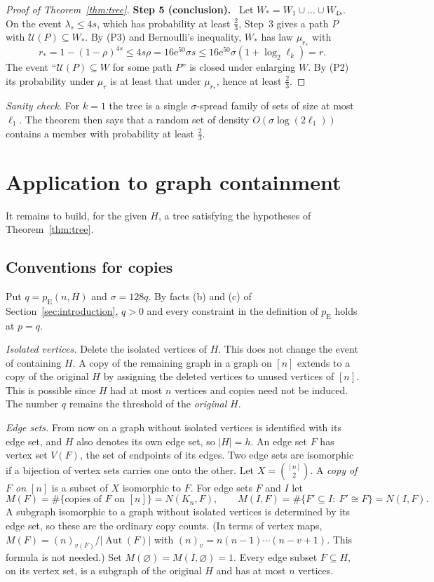 \documentclass[11pt]{article}
\numberwithin{equation}{section}
\newcommand{\pE}{p_{\mathrm E}}
\newcommand{\UU}{\mathcal U}
\newcommand{\ee}{\mathrm e}
\newcommand{\step}[2]{\medskip\noindent\textbf{Step #1 (#2).}\ }
\begin{document}
\begin{proof}[Proof of Theorem~\ref{thm:tree}]
\step{5}{conclusion}
Let $W_*=W_1\cup\dots\cup W_{4s}$. On the event $\lambda_s\le4s$,
which has probability at least $\frac23$, Step~3 gives a path $P$ with
$\UU(P)\subseteq W_*$. By (P3) and Bernoulli's inequality, $W_*$ has
law $\mu_{r_*}$ with
\[
 r_*=1-(1-\rho)^{4s}
 \le4s\rho
 =16\ee^{50}\sigma s
 \le16\ee^{50}\sigma(1+\log_2\ell_k)=r .
\]
The event ``$\UU(P)\subseteq W$ for some path $P$'' is closed under
enlarging $W$. By (P2) its probability under $\mu_r$ is at least that
under $\mu_{r_*}$, hence at least $\frac23$.
\end{proof}

\emph{Sanity check.} For $k=1$ the tree is a single $\sigma$-spread
family of sets of size at most $\ell_1$. The theorem then says that a
random set of density $O(\sigma\log(2\ell_1))$ contains a member with
probability at least $\frac23$.

\section{Application to graph containment}\label{sec:graphs}

It remains to build, for the given $H$, a tree satisfying the
hypotheses of Theorem~\ref{thm:tree}.

\subsection{Conventions for copies}

Put $q=\pE(n,H)$ and $\sigma=128q$. By facts (b) and (c) of
Section~\ref{sec:introduction}, $q>0$ and every constraint in the
definition of $\pE$ holds at $p=q$.

\emph{Isolated vertices.} Delete the isolated vertices of $H$. This
does not change the event of containing $H$. A copy of the remaining
graph in a graph on $[n]$ extends to a copy of the original $H$ by
assigning the deleted vertices to unused vertices of $[n]$. This is
possible since $H$ had at most $n$ vertices and copies need not be
induced. The number $q$ remains the threshold of the \emph{original}
$H$.

\emph{Edge sets.} From now on a graph without isolated vertices is
identified with its edge set, and $H$ also denotes its own edge set, so
$|H|=h$. An edge set $F$ has vertex set $V(F)$, the set of endpoints of
its edges. Two edge sets are isomorphic if a bijection of vertex sets
carries one onto the other. Let $X=\binom{[n]}2$. A \emph{copy of $F$
on $[n]$} is a subset of $X$ isomorphic to $F$. For edge sets $F$ and
$I$ let
\[
 M(F)=\#\{\text{copies of $F$ on $[n]$}\}=N(K_n,F),\qquad
 M(I,F)=\#\{F'\subseteq I:\ F'\cong F\}=N(I,F).
\]
A subgraph isomorphic to a graph without isolated vertices is
determined by its edge set, so these are the ordinary copy counts. (In
terms of vertex maps, $M(F)=(n)_{v(F)}/|\operatorname{Aut}(F)|$ with
$(n)_v=n(n-1)\cdots(n-v+1)$. This formula is not needed.) Set
$M(\varnothing)=M(I,\varnothing)=1$. Every edge subset $F\subseteq H$,
on its vertex set, is a subgraph of the original $H$ and has at most
$n$ vertices.
\end{document}
